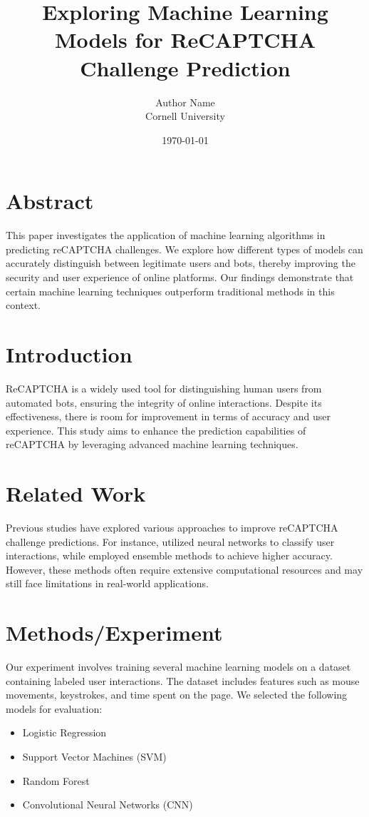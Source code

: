 \documentclass{article}
\title{Exploring Machine Learning Models for ReCAPTCHA Challenge Prediction}
\author{Author Name\\Cornell University}
\date{\today}
\begin{document}
\maketitle

\section{Abstract}
This paper investigates the application of machine learning algorithms in predicting reCAPTCHA challenges. We explore how different types of models can accurately distinguish between legitimate users and bots, thereby improving the security and user experience of online platforms. Our findings demonstrate that certain machine learning techniques outperform traditional methods in this context.

\section{Introduction}
ReCAPTCHA is a widely used tool for distinguishing human users from automated bots, ensuring the integrity of online interactions. Despite its effectiveness, there is room for improvement in terms of accuracy and user experience. This study aims to enhance the prediction capabilities of reCAPTCHA by leveraging advanced machine learning techniques.

\section{Related Work}
Previous studies have explored various approaches to improve reCAPTCHA challenge predictions. For instance, \cite{ref1} utilized neural networks to classify user interactions, while \cite{ref2} employed ensemble methods to achieve higher accuracy. However, these methods often require extensive computational resources and may still face limitations in real-world applications.

\section{Methods/Experiment}
Our experiment involves training several machine learning models on a dataset containing labeled user interactions. The dataset includes features such as mouse movements, keystrokes, and time spent on the page. We selected the following models for evaluation:

\begin{itemize}
    \item Logistic Regression
    \item Support Vector Machines (SVM)
    \item Random Forest
    \item Convolutional Neural Networks (CNN)
\end{itemize}
\end{document}
